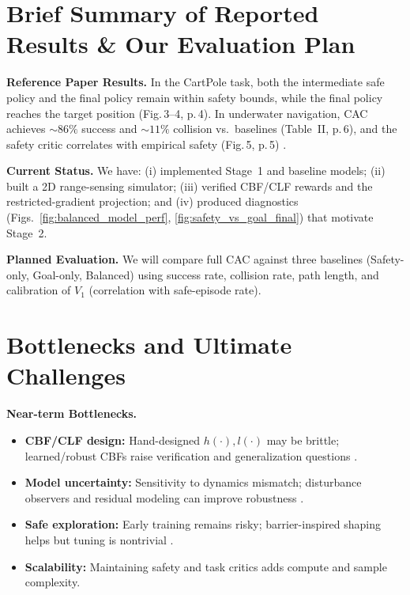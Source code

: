 \documentclass[10pt,conference]{IEEEtran}
\begin{document}
\section{Brief Summary of Reported Results \& Our Evaluation Plan}
\textbf{Reference Paper Results.} In the CartPole task, both the intermediate safe policy and the final policy remain within safety bounds, while the final policy reaches the target position (Fig.\,3–4, p.\,4). In underwater navigation, CAC achieves $\sim\!86\%$ success and $\sim\!11\%$ collision vs.\ baselines (Table~II, p.\,6), and the safety critic correlates with empirical safety (Fig.\,5, p.\,5) \cite{Xie2025CAC}.

\textbf{Current Status.} We have: (i) implemented Stage~1 and baseline models; (ii) built a 2D range-sensing simulator; (iii) verified CBF/CLF rewards and the restricted-gradient projection; and (iv) produced diagnostics (Figs.~\ref{fig:balanced_model_perf}, \ref{fig:safety_vs_goal_final}) that motivate Stage~2.

\textbf{Planned Evaluation.} We will compare full CAC against three baselines (Safety-only, Goal-only, Balanced) using success rate, collision rate, path length, and calibration of $V_1$ (correlation with safe-episode rate).

\section{Bottlenecks and Ultimate Challenges}
\textbf{Near-term Bottlenecks.}
\begin{itemize}
    \item \textbf{CBF/CLF design:} Hand-designed $h(\cdot),l(\cdot)$ may be brittle; learned/robust CBFs raise verification and generalization questions \cite{Guerrier2024Survey,Harms2024NeuralCBF}.
    \item \textbf{Model uncertainty:} Sensitivity to dynamics mismatch; disturbance observers and residual modeling can improve robustness \cite{Kalaria2024DOB}.
    \item \textbf{Safe exploration:} Early training remains risky; barrier-inspired shaping helps but tuning is nontrivial \cite{Ranjan2024BarrierShaping}.
    \item \textbf{Scalability:} Maintaining safety and task critics adds compute and sample complexity.
\end{itemize}
\end{document}

